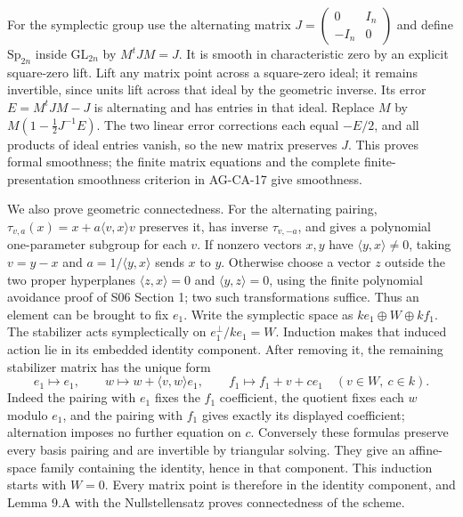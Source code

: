 \documentclass[11pt,a4paper,openany]{report}
\begin{document}
For the symplectic group use the alternating matrix \(J=\left(\begin{smallmatrix}0&I_n\\-I_n&0\end{smallmatrix}\right)\) and define \(\mathrm{Sp}_{2n}\) inside \(\mathrm{GL}_{2n}\) by \(M^tJM=J\). It is smooth in characteristic zero by an explicit square-zero lift. Lift any matrix point across a square-zero ideal; it remains invertible, since units lift across that ideal by the geometric inverse. Its error \(E=M^tJM-J\) is alternating and has entries in that ideal. Replace \(M\) by \(M(1-\tfrac12J^{-1}E)\). The two linear error corrections each equal \(-E/2\), and all products of ideal entries vanish, so the new matrix preserves \(J\). This proves formal smoothness; the finite matrix equations and the complete finite-presentation smoothness criterion in AG-CA-17 give smoothness.

We also prove geometric connectedness. For the alternating pairing, \(\tau_{v,a}(x)=x+a\langle v,x\rangle v\) preserves it, has inverse \(\tau_{v,-a}\), and gives a polynomial one-parameter subgroup for each \(v\). If nonzero vectors \(x,y\) have \(\langle y,x\rangle\ne0\), taking \(v=y-x\) and \(a=1/\langle y,x\rangle\) sends \(x\) to \(y\). Otherwise choose a vector \(z\) outside the two proper hyperplanes \(\langle z,x\rangle=0\) and \(\langle y,z\rangle=0\), using the finite polynomial avoidance proof of S06 Section 1; two such transformations suffice. Thus an element can be brought to fix \(e_1\). Write the symplectic space as \(ke_1\oplus W\oplus kf_1\). The stabilizer acts symplectically on \(e_1^\perp/ke_1=W\). Induction makes that induced action lie in its embedded identity component. After removing it, the remaining stabilizer matrix has the unique form \[
 e_1\mapsto e_1,\qquad
 w\mapsto w+\langle v,w\rangle e_1,\qquad
 f_1\mapsto f_1+v+c e_1\quad(v\in W,\ c\in k).
\] Indeed the pairing with \(e_1\) fixes the \(f_1\) coefficient, the quotient fixes each \(w\) modulo \(e_1\), and the pairing with \(f_1\) gives exactly its displayed coefficient; alternation imposes no further equation on \(c\). Conversely these formulas preserve every basis pairing and are invertible by triangular solving. They give an affine-space family containing the identity, hence in that component. This induction starts with \(W=0\). Every matrix point is therefore in the identity component, and Lemma 9.A with the Nullstellensatz proves connectedness of the scheme.
\end{document}
